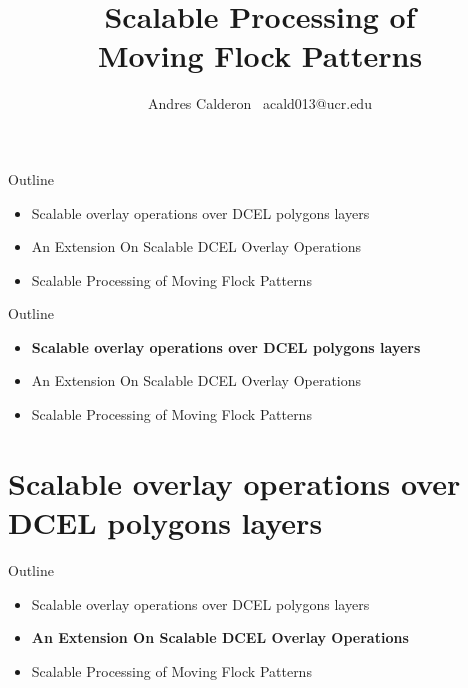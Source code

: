 \documentclass{beamer}
\title{Scalable Processing of \\Moving Flock Patterns}
\subtitle{}
\author{
    Andres Calderon \textperiodcentered \ acald013@ucr.edu \\
}
\institute{University of California, Riverside}
\begin{document}
    \begin{frame}
        \maketitle
    \end{frame}

    \begin{frame}{Outline}
        \begin{itemize}
                \item Scalable overlay operations over DCEL polygons layers
                \item An Extension On Scalable DCEL Overlay Operations
                \item Scalable Processing of Moving Flock Patterns
        \end{itemize}
    \end{frame}

    \begin{frame}{Outline}
        \begin{itemize}
                \item \textbf{Scalable overlay operations over DCEL polygons layers}
                \item An Extension On Scalable DCEL Overlay Operations
                \item Scalable Processing of Moving Flock Patterns
        \end{itemize}
    \end{frame}

    \section{Scalable overlay operations over DCEL polygons layers}

    


    \begin{frame}{Outline}
        \begin{itemize}
                \item Scalable overlay operations over DCEL polygons layers
                \item \textbf{An Extension On Scalable DCEL Overlay Operations}
                \item Scalable Processing of Moving Flock Patterns
        \end{itemize}
    \end{frame}
\end{document}
